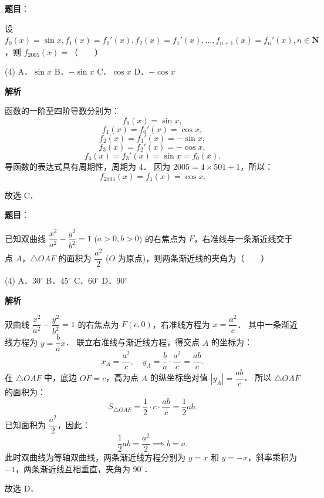 \begin{answer}

\textbf{题目}：

设 $f_0(x) = \sin x, f_1(x) = f_0'(x), f_2(x) = f_1'(x), \dots, f_{n+1}(x) = f_n'(x), n \in \mathbf{N}$，则 $f_{2005}(x) =$\mbox{（　　）}

\begin{gkopts}(4)
\task A．$\sin x$
\task B．$-\sin x$
\task C．$\cos x$
\task D．$-\cos x$
\end{gkopts}

\textbf{解析}

函数的一阶至四阶导数分别为：
\nopagebreak[4]
\[
f_0(x) = \sin x,
\]
\nopagebreak[4]
\[
f_1(x) = f_0'(x) = \cos x,
\]
\nopagebreak[4]
\[
f_2(x) = f_1'(x) = -\sin x,
\]
\nopagebreak[4]
\[
f_3(x) = f_2'(x) = -\cos x,
\]
\nopagebreak[4]
\[
f_4(x) = f_3'(x) = \sin x = f_0(x).
\]
导函数的表达式具有周期性，周期为 4．
因为 $2005 = 4 \times 501 + 1$，所以：
\nopagebreak[4]
\[
f_{2005}(x) = f_1(x) = \cos x.
\]

故选 C．


\end{answer}
\begin{answer}

\textbf{题目}：

已知双曲线 $\dfrac{x^2}{a^2} - \dfrac{y^2}{b^2} = 1$ ($a > 0, b > 0$) 的右焦点为 $F$，右准线与一条渐近线交于点 $A$，$\triangle OAF$ 的面积为 $\dfrac{a^2}{2}$ ($O$ 为原点)，则两条渐近线的夹角为\mbox{（　　）}

\begin{gkopts}(4)
\task A．$30^\circ$
\task B．$45^\circ$
\task C．$60^\circ$
\task D．$90^\circ$
\end{gkopts}

\textbf{解析}

双曲线 $\dfrac{x^2}{a^2} - \dfrac{y^2}{b^2} = 1$ 的右焦点为 $F(c, 0)$，右准线方程为 $x = \dfrac{a^2}{c}$．
其中一条渐近线方程为 $y = \dfrac{b}{a}x$．
联立右准线与渐近线方程，得交点 $A$ 的坐标为：
\nopagebreak[4]
\[
x_A = \frac{a^2}{c}, \quad y_A = \frac{b}{a} \cdot \frac{a^2}{c} = \frac{ab}{c}.
\]
在 $\triangle OAF$ 中，底边 $OF = c$，高为点 $A$ 的纵坐标绝对值 $|y_A| = \dfrac{ab}{c}$．
所以 $\triangle OAF$ 的面积为：
\nopagebreak[4]
\[
S_{\triangle OAF} = \frac{1}{2} \cdot c \cdot \frac{ab}{c} = \frac{1}{2}ab.
\]
已知面积为 $\dfrac{a^2}{2}$，因此：
\nopagebreak[4]
\[
\frac{1}{2}ab = \frac{a^2}{2} \implies b = a.
\]
此时双曲线为等轴双曲线，两条渐近线方程分别为 $y = x$ 和 $y = -x$，斜率乘积为 $-1$，两条渐近线互相垂直，夹角为 $90^\circ$．

故选 D．


\end{answer}
